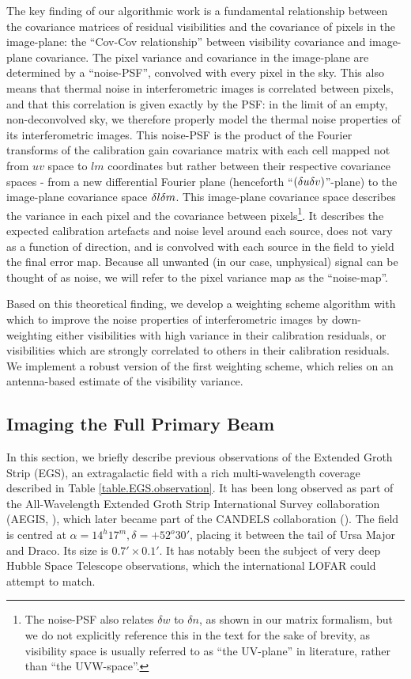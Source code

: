 \pg
The key finding of our algorithmic work is a fundamental relationship between the covariance matrices of residual visibilities and the covariance of pixels in the image-plane: the ``Cov-Cov relationship'' between visibility covariance and image-plane covariance. The pixel variance and covariance in the image-plane are determined by a ``noise-PSF'', convolved with every pixel in the sky. This also means that thermal noise in interferometric images is correlated between pixels, and that this correlation is given exactly by the PSF: in the limit of an empty, non-deconvolved sky, we therefore properly model the thermal noise properties of its interferometric images. This noise-PSF is the product of the Fourier transforms of the calibration gain covariance matrix with each cell mapped not from $uv$ space to $lm$ coordinates but rather between their respective covariance spaces - from a new {differential Fourier plane (henceforth ``$\left(\delta u\delta v\right)$''-plane) to the image-plane covariance space $\delta l\delta m$. This image-plane covariance space describes} the variance in each pixel and the covariance between pixels\footnote{{The noise-PSF also relates $\delta w$ to $\delta n$, as shown in our matrix formalism, but we do not explicitly reference this in the text for the sake of brevity, as visibility space is usually referred to as ``the UV-plane'' in literature, rather than ``the UVW-space''.}}. It describes the expected calibration artefacts and noise level around each source, does not vary as a function of direction, and is convolved with each source in the field to yield the final error map. Because all unwanted (in our case, unphysical) signal can be thought of as noise, we will refer to {the pixel variance map} as the ``noise-map''.

\pg
Based on this theoretical finding, we develop a weighting scheme algorithm with which to improve the noise properties of interferometric images by down-weighting either visibilities with high variance in their calibration residuals, or visibilities which are strongly correlated to others in their calibration residuals. We implement a robust version of the first weighting scheme, which relies on an antenna-based estimate of the visibility variance. 


\subsection{Imaging the Full Primary Beam}


\pg
In this section, we briefly describe previous observations of the Extended Groth Strip (EGS), an extragalactic field with a rich multi-wavelength coverage described in Table \ref{table.EGS.observation}. It has been long observed as part of the All-Wavelength Extended Groth Strip International Survey collaboration (AEGIS, ), which later became part of the CANDELS collaboration (). The field is centred at $\alpha=14^h17^m,\delta=+52^o 30'$, placing it between the tail of Ursa Major and Draco. Its size is $0.7'\times 0.1'$. It has notably been the subject of very deep Hubble Space Telescope observations, which the international LOFAR could attempt to match. 

